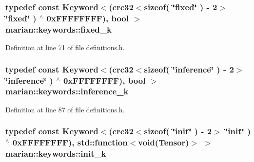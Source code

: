 \subsubsection[{\texorpdfstring{fixed\+\_\+k}{fixed_k}}]{\setlength{\rightskip}{0pt plus 5cm}typedef const {\bf Keyword}$<$({\bf crc32}$<$sizeof( \char`\"{}fixed\char`\"{} ) -\/ 2$>$ \char`\"{}{\bf fixed}\char`\"{} ) $^\wedge$ 0x\+F\+F\+F\+F\+F\+F\+F\+F), bool $>$ marian\+::keywords\+::fixed\+\_\+k}\hypertarget{namespacemarian_1_1keywords_ad5baa099c8c1e66e037234d2cfd33fdb}{}\label{namespacemarian_1_1keywords_ad5baa099c8c1e66e037234d2cfd33fdb}


Definition at line 71 of file definitions.\+h.

\subsubsection[{\texorpdfstring{inference\+\_\+k}{inference_k}}]{\setlength{\rightskip}{0pt plus 5cm}typedef const {\bf Keyword}$<$({\bf crc32}$<$sizeof( \char`\"{}inference\char`\"{} ) -\/ 2$>$ \char`\"{}{\bf inference}\char`\"{} ) $^\wedge$ 0x\+F\+F\+F\+F\+F\+F\+F\+F), bool $>$ marian\+::keywords\+::inference\+\_\+k}\hypertarget{namespacemarian_1_1keywords_a70c1df66249f109b61873988973ed61b}{}\label{namespacemarian_1_1keywords_a70c1df66249f109b61873988973ed61b}


Definition at line 87 of file definitions.\+h.

\subsubsection[{\texorpdfstring{init\+\_\+k}{init_k}}]{\setlength{\rightskip}{0pt plus 5cm}typedef const {\bf Keyword}$<$({\bf crc32}$<$sizeof( \char`\"{}init\char`\"{} ) -\/ 2$>$ \char`\"{}{\bf init}\char`\"{} ) $^\wedge$ 0x\+F\+F\+F\+F\+F\+F\+F\+F), std\+::function$<$void(\+Tensor)$>$ $>$ marian\+::keywords\+::init\+\_\+k}\hypertarget{namespacemarian_1_1keywords_a4fd3849e3b95e8aac7ab3ee9df8f517d}{}\label{namespacemarian_1_1keywords_a4fd3849e3b95e8aac7ab3ee9df8f517d}


